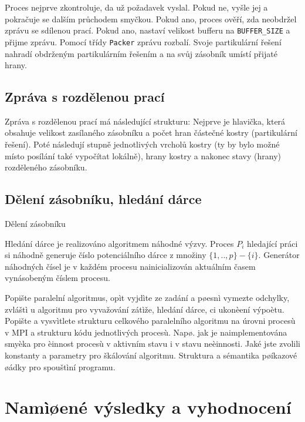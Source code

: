 \documentclass[12pt]{article}
\begin{document}
Proces nejprve zkontroluje, da už požadavek vyslal. Pokud ne, vyšle jej a pokračuje se dalším průchodem smyčkou. Pokud ano, proces ověří, zda neobdržel zprávu se sdílenou prací. Pokud ano, nastaví velikost bufferu na \texttt{BUFFER\_SIZE} a přijme zprávu. Pomocí třídy \texttt{Packer} zprávu rozbalí. Svoje partikulární řešení nahradí obdrženým partikulárním řešením a na svůj zásobník umístí přijaté hrany.

\subsection{Zpráva s rozdělenou prací}
Zpráva s rozdělenou prací má následující strukturu: Nejprve je hlavička, která obsahuje velikost zasílaného zásobníku a počet hran částečné kostry (partikulární řešení). Poté následují stupně jednotlivých vrcholů kostry (ty by bylo možné místo posílání také vypočítat lokálně), hrany kostry a nakonec stavy (hrany) rozděleného zásobníku.

\subsection{Dělení zásobníku, hledání dárce}
Dělení zásobníku 

Hledání dárce je realizováno algoritmem náhodné výzvy. Proces $P_{i}$ hledající práci si náhodně generuje číslo potenciálního dárce z množiny $\{1, .. ,p\}-\{i\}$. Generátor náhodných čísel je v každém procesu nainicializován aktuálním časem vynásobeným číslem procesu.

Popište paralelní algoritmus, opìt vyjdìte ze zadání a pøesnì
vymezte odchylky, zvláštì u algoritmu pro vyvažování zátìže, hledání
dárce, ci ukonèení výpoètu.  Popište a vysvìtlete strukturu
celkového paralelního algoritmu na úrovni procesù v MPI a strukturu
kódu jednotlivých procesù. Napø. jak je naimplementována smyèka pro
èinnost procesù v aktivním stavu i v stavu neèinnosti. Jaké jste
zvolili konstanty a parametry pro škálování algoritmu. Struktura a
sémantika pøíkazové øádky pro spouštìní programu.

\section{Namìøené výsledky a vyhodnocení}
\end{document}
